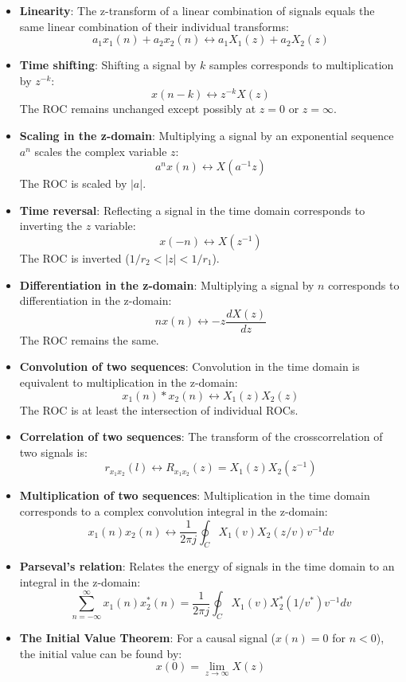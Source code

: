 \begin{itemize}
\tightlist
\item
  \textbf{Linearity}: The z-transform of a linear combination of signals
  equals the same linear combination of their individual transforms:
  \[a_1x_1(n) + a_2x_2(n) \leftrightarrow a_1X_1(z) + a_2X_2(z)\]
\item
  \textbf{Time shifting}: Shifting a signal by \(k\) samples corresponds
  to multiplication by \(z^{-k}\):
  \[x(n - k) \leftrightarrow z^{-k}X(z)\] The ROC remains unchanged
  except possibly at \(z=0\) or \(z=\infty\).
\item
  \textbf{Scaling in the z-domain}: Multiplying a signal by an
  exponential sequence \(a^n\) scales the complex variable \(z\):
  \[a^nx(n) \leftrightarrow X(a^{-1}z)\] The ROC is scaled by \(|a|\).
\item
  \textbf{Time reversal}: Reflecting a signal in the time domain
  corresponds to inverting the \(z\) variable:
  \[x(-n) \leftrightarrow X(z^{-1})\] The ROC is inverted
  (\(1/r_2 < |z| < 1/r_1\)).
\item
  \textbf{Differentiation in the z-domain}: Multiplying a signal by
  \(n\) corresponds to differentiation in the z-domain:
  \[nx(n) \leftrightarrow -z \frac{dX(z)}{dz}\] The ROC remains the
  same.
\item
  \textbf{Convolution of two sequences}: Convolution in the time domain
  is equivalent to multiplication in the z-domain:
  \[x_1(n) * x_2(n) \leftrightarrow X_1(z)X_2(z)\] The ROC is at least
  the intersection of individual ROCs.
\item
  \textbf{Correlation of two sequences}: The transform of the
  crosscorrelation of two signals is:
  \[r_{x_1x_2}(l) \leftrightarrow R_{x_1x_2}(z) = X_1(z)X_2(z^{-1})\]
\item
  \textbf{Multiplication of two sequences}: Multiplication in the time
  domain corresponds to a complex convolution integral in the z-domain:
  \[x_1(n)x_2(n) \leftrightarrow \frac{1}{2\pi j} \oint_C X_1(v)X_2(z/v)v^{-1}dv\]
\item
  \textbf{Parseval's relation}: Relates the energy of signals in the
  time domain to an integral in the z-domain:
  \[\sum_{n=-\infty}^{\infty} x_1(n)x_2^*(n) = \frac{1}{2\pi j} \oint_C X_1(v)X_2^*(1/v^*)v^{-1}dv\]
\item
  \textbf{The Initial Value Theorem}: For a causal signal (\(x(n) = 0\)
  for \(n < 0\)), the initial value can be found by:
  \[x(0) = \lim_{z \to \infty} X(z)\]
\end{itemize}

